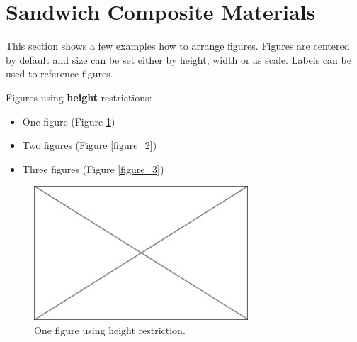 \section{Sandwich Composite Materials}
\label{sec:scm}


This section shows a few examples how to arrange figures. Figures are centered by default and size can be set either by height, width or as scale. Labels can be used to reference figures.

Figures using \textbf{height} restrictions: 
\begin{itemize}
	\item One figure (Figure \ref{figure_1})
	\item Two figures (Figure \ref{figure_2})
	\item Three figures (Figure \ref{figure_3})
\end{itemize}

\begin{figure}[H] %
	\begin{center}
		\includegraphics[height=5cm]{Figures/Chapter_1/placeholder} \caption{
			\label{figure_1} One figure using height restriction.}
		\vspace{-0.5cm}
	\end{center}
\end{figure}

